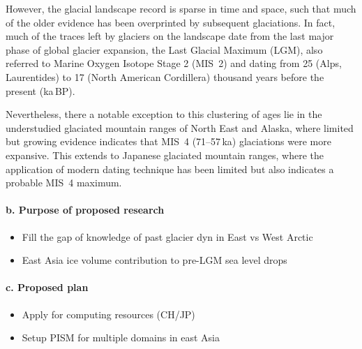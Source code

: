 \documentclass{article}
\begin{document}
    However, the glacial landscape record is sparse in time and space, such that
    much of the older evidence has been overprinted by subsequent glaciations.
    In fact, much of the traces left by glaciers on the landscape date from the
    last major phase of global glacier expansion, the Last Glacial Maximum
    (LGM), also referred to Marine Oxygen Isotope Stage 2 (MIS~2) and dating
    from 25 (Alps, Laurentides) to 17 (North American Cordillera) thousand
    years before the present (ka\,BP).

    Nevertheless, there a notable exception to this clustering of ages lie in
    the understudied glaciated mountain ranges of North East and Alaska, where
    limited but growing evidence indicates that MIS~4 (71--57\,ka) glaciations
    were more expansive. This extends to Japanese glaciated mountain ranges,
    where the application of modern dating technique has been limited but also
    indicates a probable MIS~4 maximum.


\paragraph{b. Purpose of proposed research}

    \begin{itemize}
      \item{Fill the gap of knowledge of past glacier dyn in East vs West Arctic}
      \item{East Asia ice volume contribution to pre-LGM sea level drops}
    \end{itemize}

\paragraph{c. Proposed plan}

    \begin{itemize}
      \item{Apply for computing resources (CH/JP)}
      \item{Setup PISM for multiple domains in east Asia}
    \end{itemize}

\end{document}
